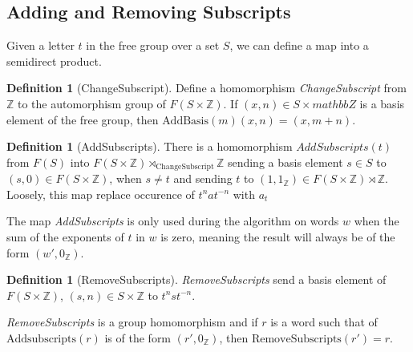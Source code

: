 \documentclass[11pt]{article} %
\theoremstyle{definition}
\theoremstyle{definition}
\theoremstyle{definition}
\theoremstyle{definition}
\theoremstyle{definition}
\newtheorem{defn}[theorem]{Definition}
\theoremstyle{definition}
\begin{document}
\subsection{Adding and Removing Subscripts}

Given a letter $t$ in the free group over a set $S$, we can define a map into a
semidirect product.

\begin{defn}[ChangeSubscript]\label{changesubscript}
  Define a homomorphism \textit{ChangeSubscript} from $\mathbb{Z}$ to the automorphism
  group of $F(S \times \mathbb{Z})$. If $(x, n) \in S \times mathbb{Z}$ is a basis
  element of the free group, then $\text{AddBasis}(m)(x, n) = (x, m + n)$.
\end{defn}

\begin{defn}[AddSubscripts]\label{AddSubscripts}
  There is a homomorphism $AddSubscripts(t)$ from $F(S)$ into $F(S \times \mathbb{Z})
  \rtimes_{\text{ChangeSubscript}} \mathbb{Z}$ sending a basis element $s \in S$ to
  $(s, 0) \in F(S \times \mathbb{Z})$, when $s \ne t$ and sending $t$ to
  $(1, 1_\mathbb{Z}) \in F(S \times \mathbb{Z}) \rtimes \mathbb{Z}$. Loosely, this map
  replace occurence of $t^n a t^{-n}$ with $a_t$
\end{defn}

The map \textit{AddSubscripts} is only used during the algorithm on words $w$ when the sum of the
exponents of $t$ in $w$ is zero, meaning the result will always be of the form
$(w', 0_{\mathbb{Z}})$.

\begin{defn}[RemoveSubscripts]
  \textit{RemoveSubscripts} send a basis element of $F(S\times \mathbb{Z})$,  $(s, n) \in S\times \mathbb{Z}$
  to $t^n s t^{-n}$.
\end{defn}
\textit{RemoveSubscripts} is a group homomorphism and if $r$ is a word such that
of $\text{Addsubscripts}(r)$ is of the form $(r', 0_\mathbb{Z})$,
then $\text{RemoveSubscripts}(r')=r$.


\end{document}
